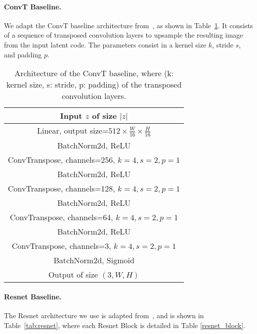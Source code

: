 \documentclass[10pt,twocolumn,letterpaper]{article}
\begin{document}
\paragraph{ConvT Baseline.}
We adapt the ConvT baseline architecture from~\cite{radford2015unsupervised}, as shown in Table~\ref{tab:convT}. It consists of a sequence of transposed convolution layers to upsample the resulting image from the input latent code. The parameters consist in a kernel size $k$, stride $s$, and padding $p$.

\begin{table}[ht]
	\caption{\label{tab:convT} Architecture of the ConvT baseline, where (k: kernel size, s: stride, p: padding) of the transposed convolution layers.}
   	\centering
   	\begin{tabular}{c}
		\toprule
	 	Input $z$ of size $|z|$ \\
       	\midrule
        Linear, output size=$512\times \frac{W}{16} \times \frac{H}{16}$ \\
        BatchNorm2d, ReLU \\
        \midrule
        ConvTranspose, channels=256, $k=4, s=2, p=1$ \\
        BatchNorm2d, ReLU \\
		\midrule
		ConvTranspose, channels=128, $k=4, s=2, p=1$ \\
        BatchNorm2d, ReLU \\
        \midrule
        ConvTranspose, channels=64, $k=4, s=2, p=1$ \\
        BatchNorm2d, ReLU \\
		\midrule
		ConvTranspose, channels=3, $k=4, s=2, p=1$ \\
        BatchNorm2d, Sigmoid \\
        \midrule
        Output of size  $(3,W,H)$ \\
		\bottomrule
	\end{tabular}
\end{table}\paragraph{Resnet Baseline.}
The Resnet architecture we use is adapted from~\cite{miyato2018spectral}, and is shown in Table~\ref{tab:resnet}, where each Resnet Block is detailed in Table \ref{resnet_block}.
\end{document}
